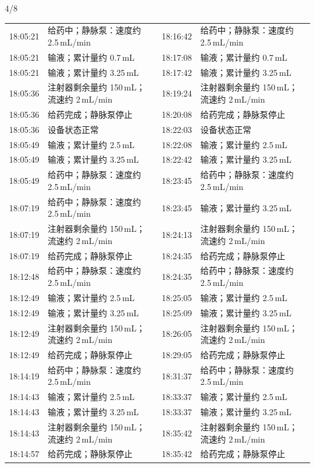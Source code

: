 \documentclass[UTF8,10pt,a4paper,fontset=fandol]{ctexart}
\newcommand{\handwritten}[1]{#1}
\begin{document}

\newpage

\begin{flushright}
\handwritten{4/8}
\end{flushright}

\noindent
\begin{tabularx}{\textwidth}{@{}lX@{\hspace{1.5em}}lX@{}}
\scriptsize
18:05:21 & 给药中；静脉泵：速度约 2.5\,mL/min & 18:16:42 & 给药中；静脉泵：速度约 2.5\,mL/min \\
18:05:21 & 输液；累计量约 0.7\,mL & 18:17:08 & 输液；累计量约 0.7\,mL \\
18:05:21 & 输液；累计量约 3.25\,mL & 18:17:42 & 输液；累计量约 3.25\,mL \\
18:05:36 & 注射器剩余量约 150\,mL；流速约 2\,mL/min & 18:19:24 & 注射器剩余量约 150\,mL；流速约 2\,mL/min \\
18:05:36 & 给药完成；静脉泵停止 & 18:20:08 & 给药完成；静脉泵停止 \\
18:05:36 & 设备状态正常 & 18:22:03 & 设备状态正常 \\
18:05:49 & 输液；累计量约 2.5\,mL & 18:22:08 & 输液；累计量约 2.5\,mL \\
18:05:49 & 输液；累计量约 3.25\,mL & 18:22:42 & 输液；累计量约 3.25\,mL \\
18:05:49 & 给药中；静脉泵：速度约 2.5\,mL/min & 18:23:45 & 给药中；静脉泵：速度约 2.5\,mL/min \\
18:07:19 & 给药中；静脉泵：速度约 2.5\,mL/min & 18:23:45 & 输液；累计量约 3.25\,mL \\
18:07:19 & 注射器剩余量约 150\,mL；流速约 2\,mL/min & 18:24:13 & 注射器剩余量约 150\,mL；流速约 2\,mL/min \\
18:07:19 & 给药完成；静脉泵停止 & 18:24:35 & 给药完成；静脉泵停止 \\
18:12:48 & 给药中；静脉泵：速度约 2.5\,mL/min & 18:24:35 & 给药中；静脉泵：速度约 2.5\,mL/min \\
18:12:49 & 输液；累计量约 2.5\,mL & 18:25:05 & 输液；累计量约 2.5\,mL \\
18:12:49 & 输液；累计量约 3.25\,mL & 18:25:09 & 输液；累计量约 3.25\,mL \\
18:12:49 & 注射器剩余量约 150\,mL；流速约 2\,mL/min & 18:26:05 & 注射器剩余量约 150\,mL；流速约 2\,mL/min \\
18:12:49 & 给药完成；静脉泵停止 & 18:29:05 & 给药完成；静脉泵停止 \\
18:14:19 & 给药中；静脉泵：速度约 2.5\,mL/min & 18:31:37 & 给药中；静脉泵：速度约 2.5\,mL/min \\
18:14:43 & 输液；累计量约 2.5\,mL & 18:33:37 & 输液；累计量约 2.5\,mL \\
18:14:43 & 输液；累计量约 3.25\,mL & 18:33:37 & 输液；累计量约 3.25\,mL \\
18:14:43 & 注射器剩余量约 150\,mL；流速约 2\,mL/min & 18:35:42 & 注射器剩余量约 150\,mL；流速约 2\,mL/min \\
18:14:57 & 给药完成；静脉泵停止 & 18:35:42 & 给药完成；静脉泵停止 \\
\end{tabularx}
\end{document}
